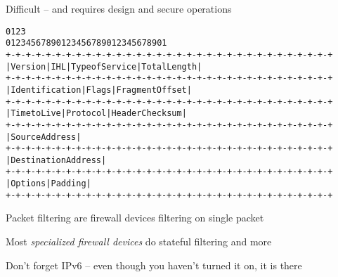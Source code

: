 \documentclass[Screen16to9,17pt]{foils}
\begin{document}
\vskip 5mm
\centerline{Difficult -- and requires design and secure operations}




\begin{alltt}\footnotesize
0                   1                   2                   3
0 1 2 3 4 5 6 7 8 9 0 1 2 3 4 5 6 7 8 9 0 1 2 3 4 5 6 7 8 9 0 1
+-+-+-+-+-+-+-+-+-+-+-+-+-+-+-+-+-+-+-+-+-+-+-+-+-+-+-+-+-+-+-+-+
|Version|  IHL  |Type of Service|          Total Length         |
+-+-+-+-+-+-+-+-+-+-+-+-+-+-+-+-+-+-+-+-+-+-+-+-+-+-+-+-+-+-+-+-+
|         Identification        |Flags|      Fragment Offset    |
+-+-+-+-+-+-+-+-+-+-+-+-+-+-+-+-+-+-+-+-+-+-+-+-+-+-+-+-+-+-+-+-+
|  Time to Live |    Protocol   |         Header Checksum       |
+-+-+-+-+-+-+-+-+-+-+-+-+-+-+-+-+-+-+-+-+-+-+-+-+-+-+-+-+-+-+-+-+
|                       Source Address                          |
+-+-+-+-+-+-+-+-+-+-+-+-+-+-+-+-+-+-+-+-+-+-+-+-+-+-+-+-+-+-+-+-+
|                    Destination Address                        |
+-+-+-+-+-+-+-+-+-+-+-+-+-+-+-+-+-+-+-+-+-+-+-+-+-+-+-+-+-+-+-+-+
|                    Options                    |    Padding    |
+-+-+-+-+-+-+-+-+-+-+-+-+-+-+-+-+-+-+-+-+-+-+-+-+-+-+-+-+-+-+-+-+
\end{alltt}

\begin{list1}
\item Packet filtering are firewall devices filtering on single packet
\item Most \emph{specialized firewall devices} do stateful filtering and more
\item Don't forget IPv6 -- even though you haven't turned it on, it is there
\end{list1}




\end{document}
